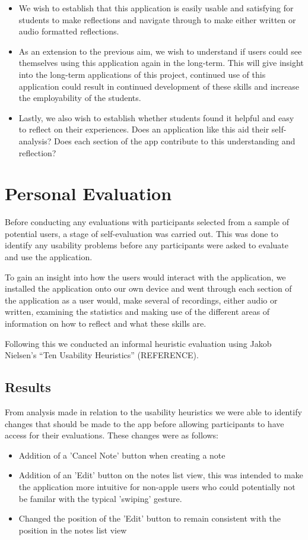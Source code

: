 \documentclass{l4proj}
\begin{document}
\begin{itemize}
    \item We wish to establish that this application is easily usable and satisfying 
    for students to make reflections and navigate through to make either written or 
    audio formatted reflections. 
    \item As an extension to the previous aim, we wish to understand if users could see themselves using this 
    application again in the long-term. This will give insight into the long-term applications of this project, 
    continued use of this application could result in continued development of these skills and increase the employability
    of the students.
    \item Lastly, we also wish to establish whether students found it helpful and easy to reflect on their
    experiences. Does an application like this aid their self-analysis? Does each section of the app 
    contribute to this understanding and reflection?
\end{itemize}

\section{Personal Evaluation}
Before conducting any evaluations with participants selected from a sample of potential users, a stage of self-evaluation
was carried out. This was done to identify any usability problems before any participants were asked to evaluate and use 
the application. 
\par 
To gain an insight into how the users would interact with the application, we installed the application onto our own device
and went through each section of the application as a user would, make several of recordings, either audio or written, 
examining the statistics and making use of the different areas of information on how to reflect and what these skills are.
\par 
Following this we conducted an informal heuristic evaluation using Jakob Nielsen’s “Ten Usability Heuristics” (REFERENCE). 

\subsection{Results}
From analysis made in relation to the usability heuristics we were able to identify changes that should 
be made to the app before allowing participants to have access for their evaluations. 
These changes were as follows:
\begin{itemize}
    \item Addition of a 'Cancel Note' button when creating a note
    \item Addition of an 'Edit' button on the notes list view, this was intended to make the application more intuitive
    for non-apple users who could potentially not be familar with the typical 'swiping' gesture.
    \item Changed the position of the 'Edit' button to remain consistent with the position in the notes list view
\end{itemize}
\end{document}
